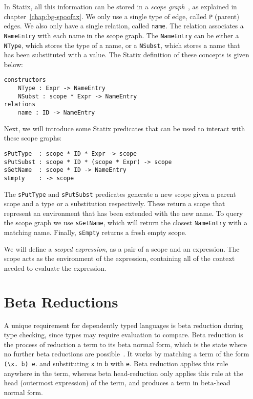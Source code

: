 In Statix, all this information can be stored in a \emph{scope graph}~\cite{scope_graphs}, as explained in chapter~\ref{chap:bg-spoofax}. We only use a single type of edge, called \verb|P| (parent) edges. We also only have a single relation, called \verb|name|. The relation associates a \verb|NameEntry| with each name in the scope graph. The \verb|NameEntry| can be either a \verb|NType|, which stores the type of a name, or a \verb|NSubst|, which stores a name that has been substituted with a value. The Statix definition of these concepts is given below:
\begin{lstlisting}
constructors
    NType : Expr -> NameEntry
    NSubst : scope * Expr -> NameEntry
relations
    name : ID -> NameEntry
\end{lstlisting}

Next, we will introduce some Statix predicates that can be used to interact with these scope graphs:

\begin{lstlisting}
sPutType  : scope * ID * Expr -> scope
sPutSubst : scope * ID * (scope * Expr) -> scope
sGetName  : scope * ID -> NameEntry
sEmpty    : -> scope
\end{lstlisting}
The \verb|sPutType| and \verb|sPutSubst| predicates generate a new scope given a parent scope and a type or a substitution respectively. These return a scope that represent an environment that has been extended with the new name. To query the scope graph we use \verb|sGetName|, which will return the closest \verb|NameEntry| with a matching name. Finally, \verb|sEmpty| returns a fresh empty scope.

We will define a \emph{scoped expression}, as a pair of a scope and an expression. The scope acts as the environment of the expression, containing all of the context needed to evaluate the expression.

\section{Beta Reductions}
\label{sec:coc-dynsyms}

A unique requirement for dependently typed languages is beta reduction during type checking, since types may require evaluation to compare. Beta reduction is the process of reduction a term to its beta normal form, which is the state where no further beta reductions are possible~\cite{tapl}. It works by matching a term of the form \verb|(\x. b) e|. and substituting \verb|x| in \verb|b| with \verb|e|. Beta reduction applies this rule anywhere in the term, whereas beta head-reduction only applies this rule at the head (outermost expression) of the term, and produces a term in beta-head normal form.

